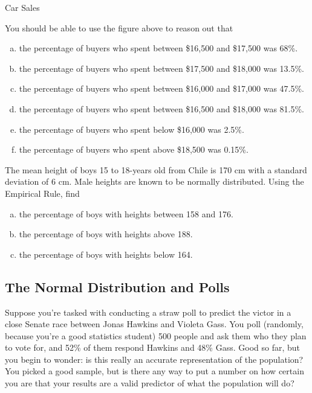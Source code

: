 \begin{example}[https://www.youtube.com/watch?v=E8rczzYhOL4]{Car Sales}
\begin{center}
\begin{tikzpicture}
\end{tikzpicture}
\end{center}

You should be able to use the figure above to reason out that
\begin{enumerate}[(a)]
\item the percentage of buyers who spent between \$16,500 and \$17,500 was 68\%.
\item the percentage of buyers who spent between \$17,500 and \$18,000 was 13.5\%.
\item the percentage of buyers who spent between \$16,000 and \$17,000 was 47.5\%.
\item the percentage of buyers who spent between \$16,500 and \$18,000 was 81.5\%.
\item the percentage of buyers who spent below \$16,000 was 2.5\%.
\item the percentage of buyers who spent above \$18,500 was 0.15\%.
\end{enumerate}
\end{example}

\begin{try}
The mean height of boys 15 to 18-years old from Chile is 170 cm with a standard deviation of 6 cm. Male heights are known to be normally distributed. Using the Empirical Rule, find
\begin{enumerate}[(a)]
\item the percentage of boys with heights between 158 and 176. 
\item the percentage of boys with heights above 188.
\item the percentage of boys with heights below 164.
\end{enumerate}
\end{try}

\subsection{The Normal Distribution and Polls}
Suppose you're tasked with conducting a straw poll to predict the victor in a close Senate race between Jonas Hawkins and Violeta Gass.  You poll (randomly, because you're a good statistics student) 500 people and ask them who they plan to vote for, and 52\% of them respond Hawkins and 48\% Gass.  Good so far, but you begin to wonder: is this really an accurate representation of the population?  You picked a good sample, but is there any way to put a number on how certain you are that your results are a valid predictor of what the population will do?

